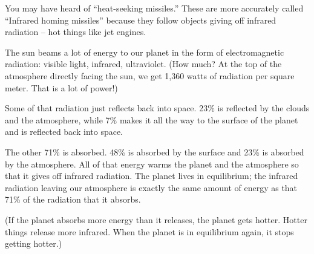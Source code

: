 You may have heard of ``heat-seeking missiles.'' These are more
accurately called ``Infrared homing missiles'' because they follow
objects giving off infrared radiation -- hot things like jet engines.

The sun beams a lot of energy to our planet in the form of
electromagnetic radiation: visible light, infrared, ultraviolet. (How
much? At the top of the atmosphere directly facing the sun, we get
1,360 watts of radiation per square meter. That is a lot of power!)

Some of that radiation just reflects back into space. 23\% is
reflected by the clouds and the atmosphere, while 7\% makes it all the way
to the surface of the planet and is reflected back into space.

The other 71\% is absorbed. 48\% is absorbed by the surface and 23\%
is absorbed by the atmosphere. All of that energy warms the planet and
the atmosphere so that it gives off infrared radiation. The planet
lives in equilibrium; the infrared radiation leaving our atmosphere is
exactly the same amount of energy as that 71\% of the radiation that
it absorbs.

(If the planet absorbs more energy than it releases, the planet gets
hotter. Hotter things release more infrared. When the planet is in
equilibrium again, it stops getting hotter.)

